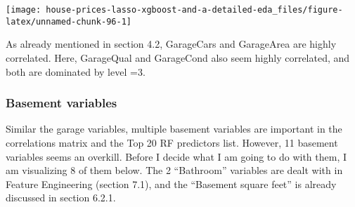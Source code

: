 \documentclass[]{article}
\begin{document}
\texttt{[image: house-prices-lasso-xgboost-and-a-detailed-eda\_files/figure-latex/unnamed-chunk-96-1]}

As already mentioned in section 4.2, GarageCars and GarageArea are
highly correlated. Here, GarageQual and GarageCond also seem highly
correlated, and both are dominated by level =3.

\subsubsection{Basement variables}\label{basement-variables-1}

Similar the garage variables, multiple basement variables are important
in the correlations matrix and the Top 20 RF predictors list. However,
11 basement variables seems an overkill. Before I decide what I am going
to do with them, I am visualizing 8 of them below. The 2 ``Bathroom''
variables are dealt with in Feature Engineering (section 7.1), and the
``Basement square feet'' is already discussed in section 6.2.1.
\end{document}
